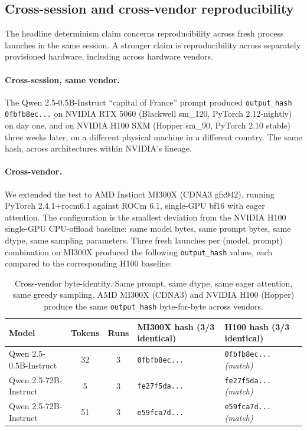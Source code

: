 \documentclass[10pt]{article}
\begin{document}
\subsection{Cross-session and cross-vendor reproducibility}

The headline determinism claim concerns reproducibility across fresh process launches in the same session. A stronger claim is reproducibility across separately provisioned hardware, including across hardware vendors.

\paragraph{Cross-session, same vendor.} The Qwen 2.5-0.5B-Instruct ``capital of France'' prompt produced \texttt{output\_hash 0fbfb8ec...} on NVIDIA RTX 5060 (Blackwell sm\_120, PyTorch 2.12-nightly) on day one, and on NVIDIA H100 SXM (Hopper sm\_90, PyTorch 2.10 stable) three weeks later, on a different physical machine in a different country. The same hash, across architectures within NVIDIA's lineage.

\paragraph{Cross-vendor.} We extended the test to AMD Instinct MI300X (CDNA3 gfx942), running PyTorch 2.4.1+rocm6.1 against ROCm 6.1, single-GPU bf16 with eager attention. The configuration is the smallest deviation from the NVIDIA H100 single-GPU CPU-offload baseline: same model bytes, same prompt bytes, same dtype, same sampling parameters. Three fresh launches per (model, prompt) combination on MI300X produced the following \texttt{output\_hash} values, each compared to the corresponding H100 baseline:

\begin{table}[h]
\centering
\small
\begin{tabular}{lccp{4cm}p{4cm}}
\toprule
Model & Tokens & Runs & MI300X hash (3/3 identical) & H100 hash (3/3 identical) \\
\midrule
Qwen 2.5-0.5B-Instruct & 32 & 3 & \texttt{0fbfb8ec...} & \texttt{0fbfb8ec...} \emph{(match)} \\
Qwen 2.5-72B-Instruct & 5 & 3 & \texttt{fe27f5da...} & \texttt{fe27f5da...} \emph{(match)} \\
Qwen 2.5-72B-Instruct & 51 & 3 & \texttt{e59fca7d...} & \texttt{e59fca7d...} \emph{(match)} \\
\bottomrule
\end{tabular}
\caption{Cross-vendor byte-identity. Same prompt, same dtype, same eager attention, same greedy sampling. AMD MI300X (CDNA3) and NVIDIA H100 (Hopper) produce the same \texttt{output\_hash} byte-for-byte across vendors.}
\end{table}
\end{document}
